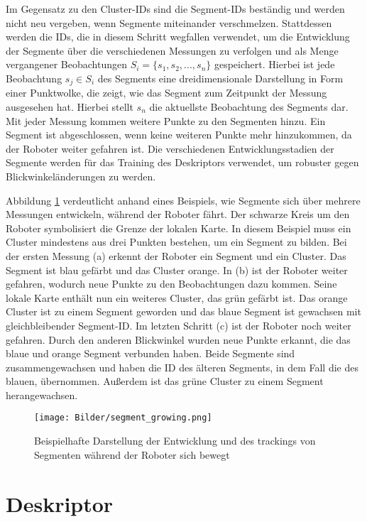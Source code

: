 Im Gegensatz zu den Cluster-IDs sind die Segment-IDs beständig und werden nicht neu vergeben, wenn Segmente miteinander verschmelzen. Stattdessen werden die IDs, die in diesem Schritt wegfallen verwendet, um die Entwicklung der Segmente über die verschiedenen Messungen zu verfolgen und als Menge vergangener Beobachtungen $ S_i = \{s_1,s_2,...,s_n\} $ gespeichert. Hierbei ist jede Beobachtung $ s_j \in S_i $ des Segments eine dreidimensionale Darstellung in Form einer Punktwolke, die zeigt, wie das Segment zum Zeitpunkt der Messung ausgesehen hat. Hierbei stellt $ s_n $ die aktuellste Beobachtung des Segments dar. Mit jeder Messung kommen weitere Punkte zu den Segmenten hinzu. Ein Segment ist abgeschlossen, wenn keine weiteren Punkte mehr hinzukommen, da der Roboter weiter gefahren ist.  Die verschiedenen Entwicklungsstadien der Segmente werden für das Training des Deskriptors verwendet, um robuster gegen Blickwinkeländerungen zu werden.

Abbildung \ref{fig:evolution_segmente} verdeutlicht anhand eines Beispiels, wie Segmente sich über mehrere Messungen entwickeln, während der Roboter fährt. Der schwarze Kreis um den Roboter symbolisiert die Grenze der lokalen Karte. In diesem Beispiel muss ein Cluster mindestens aus drei Punkten bestehen, um ein Segment zu bilden. Bei der ersten Messung (a) erkennt der Roboter ein Segment und ein Cluster. Das Segment ist blau gefärbt und das Cluster orange. In (b) ist der Roboter weiter gefahren, wodurch neue Punkte zu den Beobachtungen dazu kommen. Seine lokale Karte enthält nun ein weiteres Cluster, das grün gefärbt ist. Das orange Cluster ist zu einem Segment geworden und das blaue Segment ist gewachsen mit gleichbleibender Segment-ID. Im letzten Schritt (c) ist der Roboter noch weiter gefahren. Durch den anderen Blickwinkel wurden neue Punkte erkannt, die das blaue und orange Segment verbunden haben. Beide Segmente sind zusammengewachsen und haben die ID des älteren Segments, in dem Fall die des blauen, übernommen. Außerdem ist das grüne Cluster zu einem Segment herangewachsen.  

\begin{figure}
    \centering
    \texttt{[image: Bilder/segment\_growing.png]}
    \caption{Beispielhafte Darstellung der Entwicklung und des trackings von Segmenten während der Roboter sich bewegt \cite{Dube2018}}
    \label{fig:evolution_segmente}
\end{figure}

\section[Deskriptor (Kopp)]{Deskriptor}
\label{sec:Deskriptor}

